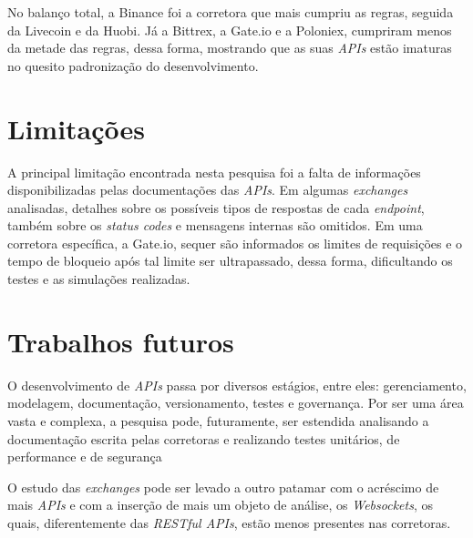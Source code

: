 No balanço total, a Binance foi a corretora que mais cumpriu as regras, seguida da Livecoin e da Huobi. Já a Bittrex, a Gate.io e a Poloniex, cumpriram menos da metade das regras, dessa forma, mostrando que as suas \textit{APIs} estão imaturas no quesito padronização do desenvolvimento.

\section{Limitações}

A principal limitação encontrada nesta pesquisa foi a falta de informações disponibilizadas pelas documentações das \textit{APIs}. Em algumas \textit{exchanges} analisadas, detalhes sobre os possíveis tipos de respostas de cada \textit{endpoint}, também sobre os \textit{status codes} e mensagens internas são omitidos. Em uma corretora específica, a Gate.io, sequer são informados os limites de requisições e o tempo de bloqueio após tal limite ser ultrapassado, dessa forma, dificultando os testes e as simulações realizadas.


\section{Trabalhos futuros}

O desenvolvimento de \textit{APIs} passa por diversos estágios, entre eles: gerenciamento, modelagem, documentação, versionamento, testes e governança. Por ser uma área vasta e complexa, a pesquisa pode, futuramente, ser estendida analisando a documentação escrita pelas corretoras e realizando testes unitários, de performance e de segurança

O estudo das \textit{exchanges} pode ser levado a outro patamar com o acréscimo de mais \textit{APIs} e com a inserção de mais um objeto de análise, os \textit{Websockets}, os quais, diferentemente das \textit{RESTful APIs}, estão menos presentes nas corretoras.
